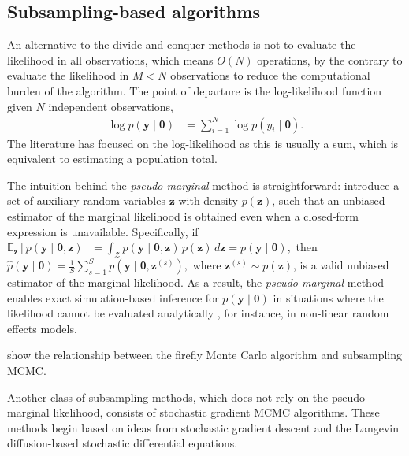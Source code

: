\subsection{Subsampling-based algorithms}

An alternative to the divide-and-conquer methods is not to evaluate the likelihood in all observations, which means $O(N)$ operations, by the contrary to evaluate the likelihood in $M<N$ observations to reduce the computational burden of the algorithm. The point of departure is the log-likelihood function given $N$ independent observations,
\begin{align*}
	\log p(\mathbf{y}\mid \boldsymbol{\theta})&=\sum_{i=1}^N \log p(y_i\mid \boldsymbol{\theta}).
\end{align*} 
The literature has focused on the log-likelihood as this is usually a sum, which is equivalent to estimating a population total. 

The intuition behind the \textit{pseudo-marginal} method is straightforward: introduce a set of auxiliary random variables \( \mathbf{z} \) with density \( p(\mathbf{z}) \), such that an unbiased estimator of the marginal likelihood is obtained even when a closed-form expression is unavailable. Specifically, if \(\mathbb{E}_{\mathbf{z}}[p(\mathbf{y} \mid \boldsymbol{\theta}, \mathbf{z})] = \int_{\mathcal{Z}} p(\mathbf{y} \mid \boldsymbol{\theta}, \mathbf{z}) \, p(\mathbf{z}) \, d\mathbf{z} = p(\mathbf{y} \mid \boldsymbol{\theta}),
\)
then
\(
\hat{p}(\mathbf{y} \mid \boldsymbol{\theta}) = \frac{1}{S} \sum_{s=1}^S p(\mathbf{y} \mid \boldsymbol{\theta}, \mathbf{z}^{(s)}),
\)
where \( \mathbf{z}^{(s)} \sim p(\mathbf{z}) \), is a valid unbiased estimator of the marginal likelihood. As a result, the \textit{pseudo-marginal} method enables exact simulation-based inference for \( p(\mathbf{y} \mid \boldsymbol{\theta}) \) in situations where the likelihood cannot be evaluated analytically \cite{andrieu2009pseudoefficient}, for instance, in non-linear random effects models.

\cite{quiroz2018subsampling,quiroz2019speeding} \cite{bardenet2017markov} show the relationship between the firefly Monte Carlo algorithm \cite{Maclaurin2015} and subsampling MCMC.

Another class of subsampling methods, which does not rely on the pseudo-marginal likelihood, consists of stochastic gradient MCMC algorithms. These methods begin based on ideas from stochastic gradient descent \cite{robbins1951stochastic} and the Langevin diffusion-based stochastic differential equations.

